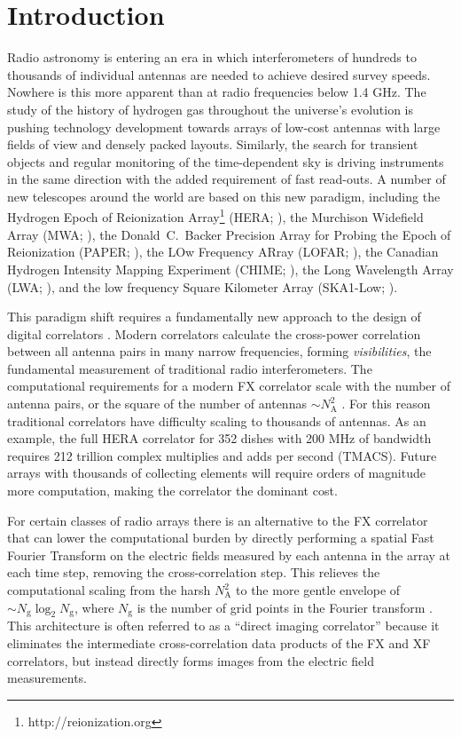 \documentclass[a4paper,fleqn,usenatbib]{mnras}
\newcommand{\Nant}{N_\textrm{A}}
\newcommand{\Ngrid}{N_\textrm{g}}
\begin{document}

\section{Introduction}

Radio astronomy is entering an era in which interferometers of hundreds to thousands of individual antennas are needed to achieve desired survey speeds. Nowhere is this more apparent than at radio frequencies below 1.4 GHz. The study of the history of hydrogen gas throughout the universe's evolution is pushing technology development towards arrays of low-cost antennas with large fields of view and densely packed layouts. Similarly, the search for transient objects and regular monitoring of the time-dependent sky is driving instruments in the same direction with the added requirement of fast read-outs. A number of new telescopes around the world are based on this new paradigm, including the Hydrogen Epoch of Reionization Array\footnote{http://reionization.org} (HERA; \citealt{deb16}), the Murchison Widefield Array (MWA; \citealt{tin13,bow13}), the Donald~C.~Backer Precision Array for Probing the Epoch of Reionization (PAPER; \citealt{par10}), the LOw Frequency ARray (LOFAR; \citealt{van13}), the Canadian Hydrogen Intensity Mapping Experiment (CHIME; \citealt{ban14}), the Long Wavelength Array (LWA; \citealt{ell13}), and the low frequency Square Kilometer Array (SKA1-Low; \citealt{mel13}).

This paradigm shift requires a fundamentally new approach to the design of
digital correlators \citep{lon00}. Modern correlators calculate the cross-power
correlation between all antenna pairs in many narrow frequencies, forming
\emph{visibilities}, the fundamental measurement of traditional radio
interferometers. The computational requirements for a modern FX correlator scale
with the number of antenna pairs, or the square of the number of antennas $\sim
\Nant^2$ \citep{bun04}. For this reason traditional correlators have difficulty
scaling to thousands of antennas. As an example, the full HERA correlator for
352 dishes with 200 MHz of bandwidth requires 212 trillion complex multiplies
and adds per second (TMACS). Future arrays with thousands of collecting elements
will require orders of magnitude more computation, making the correlator the
dominant cost.

For certain classes of radio arrays there is an alternative to the FX correlator
that can lower the computational burden by directly performing a spatial Fast
Fourier Transform \citep[FFT;][]{coo65} on the electric fields measured by each 
antenna in the array at each time step, removing the cross-correlation step. 
This relieves the computational scaling from the harsh $\Nant^2$ to the more 
gentle envelope of $\sim\Ngrid\log_2\Ngrid$, where $\Ngrid$ is the number of 
grid points in the Fourier transform \citep[e.g.][]{mor11,teg09,teg10}. This 
architecture is often referred to as a ``direct imaging correlator'' because it 
eliminates the intermediate cross-correlation data products of the FX and XF 
correlators, but instead directly forms images from the electric field 
measurements.
\end{document}
